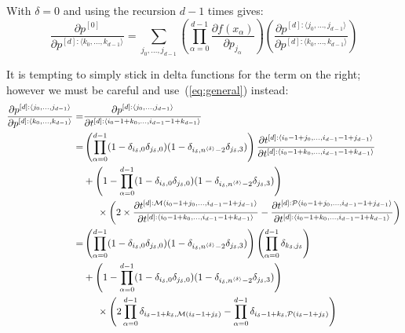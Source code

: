 \documentclass[11pt]{article}
\begin{document}
With $\delta=0$ and using the recursion $d-1$ times gives:
\begin{equation}
\frac{\partial p^{[0]}}{\partial p^{[d]: \langle k_0, \dots, k_{d-1} \rangle}}
=
\sum_{j_0,\dots,j_{d-1}} 
\left (
\prod_{\alpha=0}^{d-1} 
\frac{
\partial f(x_\alpha)
}{
\partial p_{j_\alpha}
}
\right ) 
\left (
\frac{
\partial p^{[d]: \langle j_0, \dots, j_{d-1} \rangle}
}{
\partial p^{[d]: \langle k_0, \dots, k_{d-1} \rangle}
}
\right )
\end{equation}

It is tempting to simply stick in delta functions for the term on the right; however we must be careful and use~(\ref{eq:general}) instead:
\begin{equation}
\begin{split}
\frac{
\partial p^{[d]: \langle j_0, \dots, j_{d-1} \rangle}
}{
\partial p^{[d]: \langle k_0, \dots, k_{d-1} \rangle}
}
=&
\frac{
\partial p^{[d]: \langle j_0, \dots, j_{d-1} \rangle}
}{
\partial t^{[d]: \langle i_0-1+k_0, \dots, i_{d-1}-1+k_{d-1} \rangle}
} \\
=&
\left ( \prod_{\alpha = 0}^{d-1} (1 - \delta_{i_\delta,0} \delta_{j_\delta,0} ) (1 - \delta_{i_\delta,n^{\langle \delta \rangle}-2} \delta_{j_\delta,3} ) \right )
\frac{
\partial t^{[d]:\langle i_0-1+j_0, \dots, i_{d-1}-1+j_{d-1} \rangle}
}{
\partial t^{[d]: \langle i_0-1+k_0, \dots, i_{d-1}-1+k_{d-1} \rangle}
} \\
& +
\left ( 1 - \prod_{\alpha = 0}^{d-1} (1 - \delta_{i_\delta,0} \delta_{j_\delta,0} ) (1 - \delta_{i_\delta,n^{\langle \delta \rangle}-2} \delta_{j_\delta,3} ) \right ) \\
& \hspace{5mm} \times
\left (
2 \times 
\frac{
\partial t^{[d]:{\cal M}\langle i_0-1+j_0, \dots, i_{d-1}-1+j_{d-1} \rangle}
}{
\partial t^{[d]: \langle i_0-1+k_0, \dots, i_{d-1}-1+k_{d-1} \rangle}
}
-
\frac{
\partial t^{[d]:{\cal P}\langle i_0-1+j_0, \dots, i_{d-1}-1+j_{d-1} \rangle}
}{
\partial t^{[d]: \langle i_0-1+k_0, \dots, i_{d-1}-1+k_{d-1} \rangle}
}
\right ) \\
=&
\left ( \prod_{\alpha = 0}^{d-1} (1 - \delta_{i_\delta,0} \delta_{j_\delta,0} ) (1 - \delta_{i_\delta,n^{\langle \delta \rangle}-2} \delta_{j_\delta,3}) \right )
\left (
\prod_{\alpha=0}^{d-1} \delta_{k_\delta, j_\delta}
\right ) \\
& +
\left ( 1 - \prod_{\alpha = 0}^{d-1} (1 - \delta_{i_\delta,0} \delta_{j_\delta,0} ) (1 - \delta_{i_\delta,n^{\langle \delta \rangle}-2} \delta_{j_\delta,3}) \right ) \\
& \hspace{5mm} \times
\left (
2 
\prod_{\alpha=0}^{d-1} \delta_{i_\delta-1+k_\delta, {\cal M}(i_\delta-1+j_\delta) }
-
\prod_{\alpha=0}^{d-1} \delta_{i_\delta-1+k_\delta, {\cal P}(i_\delta-1+j_\delta) }
\right ) 
\end{split}
\label{eq:shit}
\end{equation}
\end{document}

